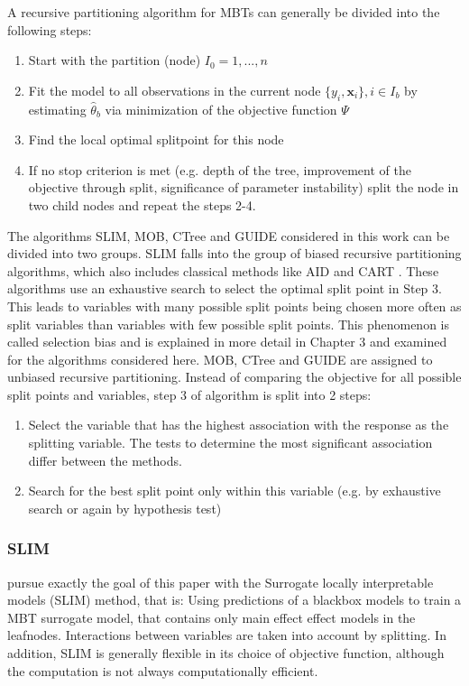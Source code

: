 A recursive partitioning algorithm for MBTs can generally be divided into the following steps:
\begin{enumerate}
    \item Start with the partition (node) $I_0 = 1,...,n$
    \item Fit the model to all observations in the current node $\{y_{i}, \mathbf{x}_{i}\}, i \in I_b$ by estimating $\hat{\theta}_b$ via minimization of the objective function $\Psi$
    \item Find the local optimal splitpoint for this node 
    \item If no stop criterion is met (e.g. depth of the tree, improvement of the objective through split, significance of parameter instability) split the node in two child nodes and repeat the steps 2-4.
\end{enumerate}


The algorithms SLIM, MOB, CTree and GUIDE considered in this work can be divided into two groups. SLIM falls into the group of biased recursive partitioning algorithms, which also includes classical methods like AID \citep{Morgan.1963} and CART \citep{Breiman.1984}. These algorithms use an exhaustive search to select the optimal split point in Step 3. This leads to variables with many possible split points being chosen more often as split variables than variables with few possible split points. This phenomenon is called selection bias and is explained in more detail in Chapter 3 and examined for the algorithms considered here.
MOB, CTree and GUIDE are assigned to unbiased recursive partitioning. Instead of comparing the objective for all possible split points and variables, step 3 of algorithm is split into 2 steps:

\begin{enumerate}
    \item Select the variable that has the highest association with the response as the splitting variable. The tests to determine the most significant association differ between the methods.
    \item Search for the best split point only within this variable (e.g. by exhaustive search or again by hypothesis test)
\end{enumerate}

\citep{Schlosser.2019}



\subsubsection{SLIM}
\citep{Hu.2020} pursue exactly the goal of this paper with the Surrogate locally interpretable models (SLIM) method, that is: Using predictions of a blackbox models to train a MBT surrogate model, that contains only main effect effect models in the leafnodes. Interactions between variables are taken into account by splitting. In addition, SLIM is generally flexible in its choice of objective function, although the computation is not always computationally efficient.

